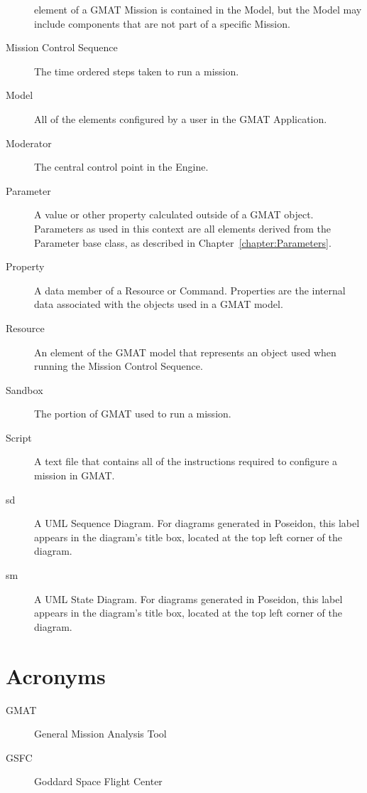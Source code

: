\begin{description}
element of a GMAT Mission is contained in the Model, but the Model may include components that are
not part of a specific Mission.
\item[Mission Control Sequence] The time ordered steps taken to run a mission.
\item[Model] All of the elements configured by a user in the GMAT Application.
\item[Moderator] The central control point in the Engine.
\item[Parameter] A value or other property calculated outside of a GMAT object.  Parameters as used
in this context are all elements derived from the Parameter base class, as described in
Chapter~\ref{chapter:Parameters}.
\item[Property] A data member of a Resource or Command.  Properties are the internal data associated
with the objects used in a GMAT model.
\item[Resource] An element of the GMAT model that represents an object used when running the Mission
Control Sequence.
\item[Sandbox] The portion of GMAT used to run a mission.
\item[Script] A text file that contains all of the instructions required to configure a mission in
GMAT.
\item[sd] A UML Sequence Diagram.  For diagrams generated in Poseidon, this label appears in the
diagram's title box, located at the top left corner of the diagram.
\item[sm] A UML State Diagram.  For diagrams generated in Poseidon, this label appears in the
diagram's title box, located at the top left corner of the diagram.
\end{description}

\section{Acronyms}

\begin{description}
\item[GMAT] General Mission Analysis Tool
\item[GSFC] Goddard Space Flight Center
\end{description}
